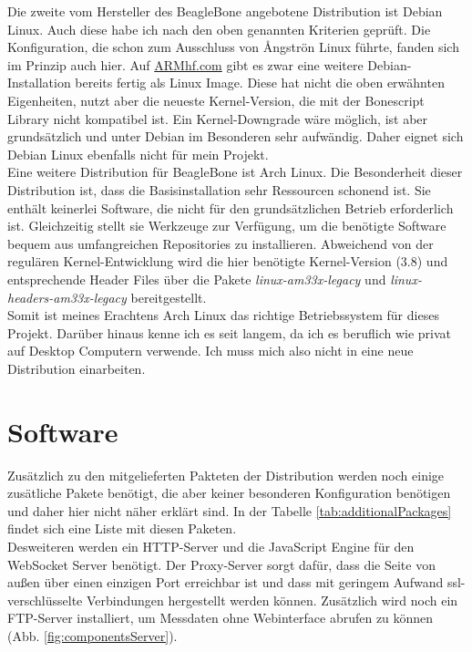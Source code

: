 Die zweite vom Hersteller des BeagleBone angebotene Distribution ist Debian Linux. Auch diese habe ich nach den oben genannten Kriterien geprüft. Die Konfiguration, die schon zum Ausschluss von {\AA}ngströn Linux führte, fanden sich im Prinzip auch hier. Auf \href{http://www.armhf.com/}{ARMhf.com} gibt es zwar eine weitere Debian-Installation bereits fertig als Linux Image. Diese hat nicht die oben erwähnten Eigenheiten, nutzt aber die neueste Kernel-Version, die mit der Bonescript Library nicht kompatibel ist. Ein Kernel-Downgrade wäre möglich, ist aber grundsätzlich und unter Debian im Besonderen sehr aufwändig. Daher eignet sich Debian Linux ebenfalls nicht für mein Projekt.\\

Eine weitere Distribution für BeagleBone ist Arch Linux. Die Besonderheit dieser Distribution ist, dass die Basisinstallation sehr Ressourcen schonend ist. Sie enthält keinerlei Software, die nicht für den grundsätzlichen Betrieb erforderlich ist. Gleichzeitig stellt sie Werkzeuge zur Verfügung, um die benötigte Software bequem aus umfangreichen Repositories zu installieren. Abweichend von der regulären Kernel-Entwicklung wird die hier benötigte Kernel-Version (3.8) und entsprechende Header Files über die Pakete \textit{linux-am33x-legacy} und \textit{linux-headers-am33x-legacy} bereitgestellt.\\

Somit ist meines Erachtens Arch Linux das richtige Betriebssystem für dieses Projekt. Darüber hinaus kenne ich es seit langem, da ich es beruflich wie privat auf Desktop Computern verwende. Ich muss mich also nicht in eine neue Distribution einarbeiten.


\section{Software}

Zusätzlich zu den mitgelieferten Pakteten der Distribution werden noch einige zusätliche Pakete benötigt, die aber keiner besonderen Konfiguration benötigen und daher hier nicht näher erklärt sind. In der Tabelle \ref{tab:additionalPackages} findet sich eine Liste mit diesen Paketen.\\

Desweiteren werden ein HTTP-Server und die JavaScript Engine für den WebSocket Server benötigt. Der Proxy-Server sorgt dafür, dass die Seite von außen über einen einzigen Port erreichbar ist und dass mit geringem Aufwand \gls{ssl}-verschlüsselte Verbindungen hergestellt werden können. Zusätzlich wird noch ein FTP-Server installiert, um Messdaten ohne Webinterface abrufen zu können (Abb. \ref{fig:componentsServer}).

